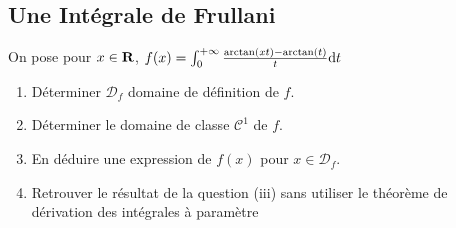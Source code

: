 \subsection{Une Intégrale de Frullani}
\begin{exercice}
	On pose pour $x\in\operatorname{\mathbf{R}}$, $f(x)=\int_0^{+\infty}\frac{\arctan(xt)-\arctan(t)}t\mathrm{d} t$
	\begin{enumerate}
		\item Déterminer $\mathcal D_f$ domaine de définition de $f$.
		\item Déterminer le domaine de classe $\mathcal C^1$ de $f$.
		\item En déduire une expression de $f(x)$ pour $x\in\mathcal D_f$.
		\item Retrouver le résultat de la question (iii) sans utiliser le théorème de dérivation des intégrales à paramètre\\
	\end{enumerate}
\end{exercice}

